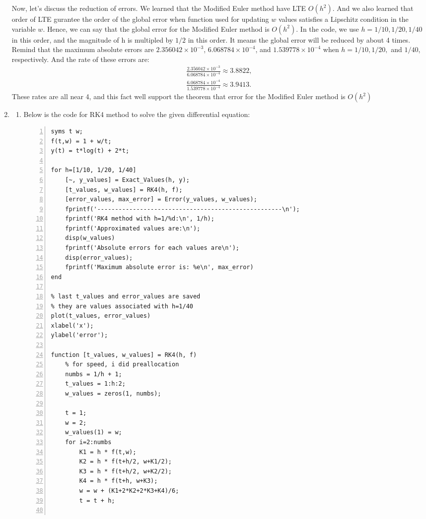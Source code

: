 \documentclass{article}
\begin{document}
\begin{enumerate}
    Now, let's discuss the reduction of errors. We learned that the Modified Euler method have LTE $O(h^2)$. And we also learned that order of LTE gurantee the order of the global error when function used for updating $w$ values satisfies a Lipschitz condition in the variable $w$. Hence, we can say that the global error for the Modified Euler method is $O(h^2)$. In the code, we use $h=1/10, 1/20, 1/40$ in this order, and the magnitude of h is multipled by $1/2$ in this order. It means the global error will be reduced by about 4 times. Remind that the maximum absolute errors are $2.356042\times 10^{-3}$, $6.068784\times 10^{-4}$, and $1.539778\times 10^{-4}$ when $h=1/10, 1/20,$ and $1/40$, respectively. And the rate of these errors are: \begin{align*}
        \frac{2.356042\times 10^{-3}}{6.068784\times 10^{-4}} \approx 3.8822,
        \\ \frac{6.068784\times 10^{-4}}{1.539778\times 10^{-4}} \approx 3.9413.
    \end{align*} These rates are all near 4, and this fact well support the theorem that error for the Modified Euler method is $O(h^2)$
    \item \begin{enumerate}[wide=10pt]
        \item Below is the code for RK4 method to solve the given differential equation: \begin{lstlisting}[frame=single, numbers=left, style=Matlab-editor]
syms t w;
f(t,w) = 1 + w/t;
y(t) = t*log(t) + 2*t;

for h=[1/10, 1/20, 1/40]
    [~, y_values] = Exact_Values(h, y);
    [t_values, w_values] = RK4(h, f);
    [error_values, max_error] = Error(y_values, w_values);
    fprintf('----------------------------------------------------\n');
    fprintf('RK4 method with h=1/%d:\n', 1/h);
    fprintf('Approximated values are:\n');
    disp(w_values)
    fprintf('Absolute errors for each values are\n');
    disp(error_values);
    fprintf('Maximum absolute error is: %e\n', max_error)
end

% last t_values and error_values are saved
% they are values associated with h=1/40
plot(t_values, error_values)
xlabel('x');
ylabel('error');

function [t_values, w_values] = RK4(h, f)
    % for speed, i did preallocation
    numbs = 1/h + 1;
    t_values = 1:h:2;
    w_values = zeros(1, numbs);

    t = 1;
    w = 2;
    w_values(1) = w;
    for i=2:numbs
        K1 = h * f(t,w);
        K2 = h * f(t+h/2, w+K1/2);
        K3 = h * f(t+h/2, w+K2/2);
        K4 = h * f(t+h, w+K3);
        w = w + (K1+2*K2+2*K3+K4)/6;
        t = t + h;


\end{lstlisting}
\end{enumerate}
\end{enumerate}
\end{document}
